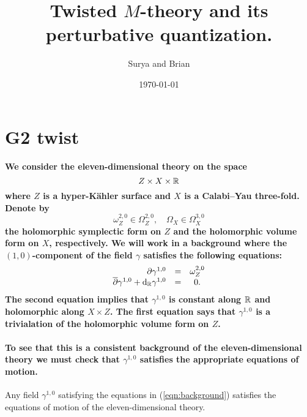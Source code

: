 \documentclass[11pt]{amsart}
\author{Surya and Brian}
\date{\today}
\title{Twisted \(M\)-theory and its perturbative quantization.}
\begin{document}
\maketitle

\section{G2 twist}

\paragraph{We consider the eleven-dimensional theory on the space
\[
  Z \times X \times \mathbb R
\]
where $Z$ is a hyper-K\"{a}hler surface and $X$ is a Calabi--Yau three-fold.
Denote by 
\[
\omega_Z^{2,0} \in \Omega^{2,0}_Z , \quad \Omega_X \in \Omega^{3,0}_X
\]
the holomorphic symplectic form on $Z$ and the holomorphic volume form on $X$, respectively.
We will work in a background where the $(1,0)$-component of the field $\gamma$ satisfies the following equations:
\begin{equation}\label{eqn:background}
  \begin{array}{rcccc}
    \partial \gamma^{1,0} & = & \omega_Z^{2,0} \\
    \overline{\partial} \gamma^{1,0} + {\rm d}_{\mathbb R} \gamma^{1,0} & = & 0 .
  \end{array}
\end{equation}
The second equation implies that $\gamma^{1,0}$ is constant along $\mathbb R$ and holomorphic along $X \times Z$.
The first equation says that $\gamma^{1,0}$ is a trivialation of the holomorphic volume form on $Z$.}

\paragraph{To see that this is a consistent background of the eleven-dimensional theory we must check that $\gamma^{1,0}$ satisfies the appropriate equations of motion.}

\begin{lem}
  Any field $\gamma^{1,0}$ satisfying the equations in (\ref{eqn:background}) satisfies the equations of motion of the eleven-dimensional theory.
\end{lem}
\end{document}

